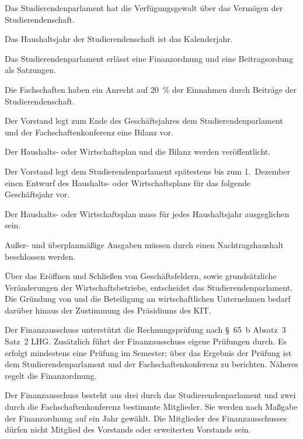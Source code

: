 \begin{contract}

Das Studierendenparlament hat die Verfügungsgewalt über das Vermögen der Studierendenschaft.

Das Haushaltsjahr der Studierendenschaft ist das Kalenderjahr.

Das Studierendenparlament erlässt eine Finanzordnung und eine Beitragsordung als Satzungen.

Die Fachschaften haben ein Anrecht auf 20~\% der Einnahmen durch Beiträge der Studierendenschaft. \label{haushalt:fachschaftsgelder}

Der Vorstand legt zum Ende des Geschäftsjahres dem Studierendenparlament und der Fachschaftenkonferenz eine Bilanz vor.

Der Haushalts- oder Wirtschaftsplan und die Bilanz werden veröffentlicht.


 \label{haushalt:haushaltsplan}

Der Vorstand legt dem Studierendenparlament spätestens bis zum 1.~Dezember einen Entwurf des Haushalts- oder Wirtschaftsplans für das folgende Geschäftsjahr vor.

Der Haushalts- oder Wirtschaftsplan muss für jedes Haushaltsjahr ausgeglichen sein.

Außer- und überplanmäßige Ausgaben müssen durch einen Nachtragshaushalt beschlossen werden.

Über das Eröffnen und Schließen von Geschäftsfeldern, sowie grundsätzliche Veränderungen der Wirtschaftsbetriebe, entscheidet das Studierendenparlament. Die Gründung von und die Beteiligung an wirtschaftlichen Unternehmen bedarf darüber hinaus der Zustimmung des Präsidiums des KIT.


 \label{haushalt:finanzauschuss}

Der Finanzausschuss unterstützt die Rechnungsprüfung nach §~65~b Absatz~3 Satz~2 LHG. Zusätzlich führt der Finanzausschuss eigene Prüfungen durch. Es erfolgt mindestens eine Prüfung im Semester; über das Ergebnis der Prüfung ist dem Studierendenparlament und der Fachschaftenkonferenz zu berichten. Näheres regelt die Finanzordnung.

Der  Finanzausschuss besteht aus drei durch das Studierendenparlament und  zwei durch die Fachschaftenkonferenz bestimmte Mitglieder. Sie werden nach Maßgabe der Finanzordnung auf ein Jahr gewählt. Die Mitglieder des Finanzausschusses dürfen nicht Mitglied des Vorstands oder erweiterten Vorstands sein. \label{haushalt:finanzausschuss:wahl}



\end{contract}
